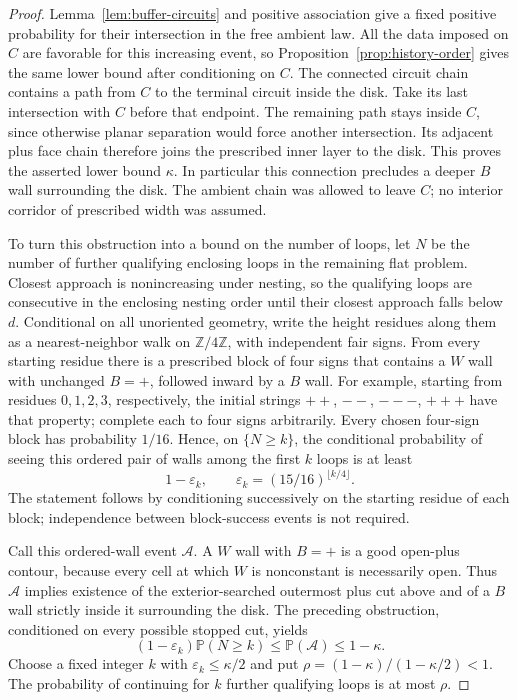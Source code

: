 \documentclass[11pt]{article}
\theoremstyle{definition}
\theoremstyle{remark}
\numberwithin{equation}{section}
\begin{document}
\begin{proof}
Lemma~\ref{lem:buffer-circuits} and positive association give a fixed
positive probability for their intersection in the free ambient law.
All the data imposed on $C$ are favorable for this increasing event,
so Proposition~\ref{prop:history-order} gives the same lower bound after
conditioning on $C$.  The connected circuit chain contains a path
from $C$ to the terminal circuit inside the disk.  Take its last
intersection with $C$ before that endpoint.  The remaining path stays
inside $C$, since otherwise planar separation would force another
intersection.  Its adjacent plus face chain therefore joins the
prescribed inner layer to the disk.  This proves the asserted lower
bound $\kappa$.  In particular this connection precludes a deeper
$B$ wall surrounding the disk.  The ambient chain was allowed to leave
$C$; no interior corridor of prescribed width was assumed.

To turn this obstruction into a bound on the number of loops, let $N$
be the number of further qualifying enclosing loops in the remaining
flat problem.  Closest approach is nonincreasing under nesting, so the
qualifying loops are consecutive in the enclosing nesting order until
their closest approach falls below $d$.  Conditional on all unoriented
geometry, write the height residues along them as a nearest-neighbor
walk on $\mathbb Z/4\mathbb Z$, with independent fair signs.  From every starting
residue there is a prescribed block of four signs that contains a
$W$ wall with unchanged $B=+$, followed inward by a $B$ wall.  For
example, starting from residues $0,1,2,3$, respectively, the initial
strings $++$, $--$, $---$, $+++$ have that property; complete each to
four signs arbitrarily.  Every chosen four-sign block has probability
$1/16$.  Hence, on $\{N\geq k\}$, the conditional probability of
seeing this ordered pair of walls among the first $k$ loops is at least
\[
 1-\varepsilon_k,
 \qquad \varepsilon_k=(15/16)^{\lfloor k/4\rfloor}.
\]
The statement follows by conditioning successively on the starting
residue of each block; independence between block-success events is
not required.

Call this ordered-wall event $\mathcal A$.  A $W$ wall with $B=+$ is
a good open-plus contour, because every cell at which $W$ is
nonconstant is necessarily open.  Thus $\mathcal A$ implies existence
of the exterior-searched outermost plus cut above and of a $B$ wall
strictly inside it surrounding the disk.  The preceding obstruction,
conditioned on every possible stopped cut, yields
\[
 (1-\varepsilon_k)\mathbb P(N\geq k)
 \leq\mathbb P(\mathcal A)\leq1-\kappa.
\]
Choose a fixed integer $k$ with $\varepsilon_k\leq\kappa/2$ and put
$\rho=(1-\kappa)/(1-\kappa/2)<1$.  The probability of continuing for
$k$ further qualifying loops is at most $\rho$.


\end{proof}
\end{document}
